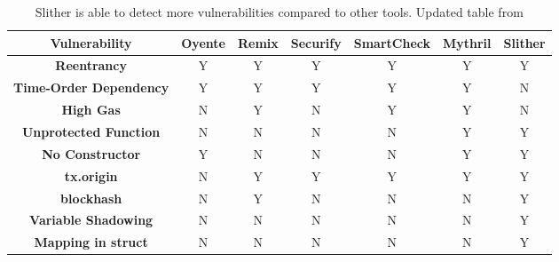 \begin{table}[htb]
	\caption{Slither is able to detect more vulnerabilities compared to other tools. Updated table from \cite{tools}}
	\label{table:slither}
	\centering
	\scriptsize
	\setlength\LTleft{-1in}
	\setlength\LTright{-1in}
	\begin{tabular}{|c|c|c|c|c|c|c|}
		\hline
		\textbf{Vulnerability} & 
		\textbf{Oyente} & \textbf{Remix} & \textbf{Securify} & \textbf{SmartCheck} & \textbf{Mythril} & \textbf{Slither} \\ \hline
		\textbf{Reentrancy}        & Y & Y & Y & Y & Y & Y \\
		\textbf{Time-Order Dependency}               & Y & Y & Y & Y & Y & N \\
		\textbf{High Gas}          & N & Y & N & Y & Y & N \\
		\textbf{Unprotected Function}  & N & N & N & N & Y & Y \\  
		\textbf{No Constructor}    & Y & N & N & N & Y & Y \\ 
		\textbf{tx.origin}         & N & Y & Y & Y & Y & Y \\ 
		\textbf{blockhash}         & N & Y & N & N & N & Y \\
		\textbf{Variable Shadowing}    & N & N & N & N & N & Y \\ 
		\textbf{Mapping in struct} & N & N & N & N & N & Y \\ 
		\hline
	\end{tabular}
	\vspace{-2ex}
\end{table}
